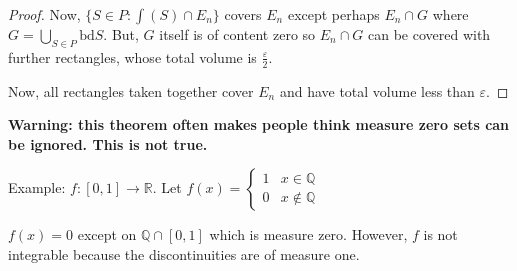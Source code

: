 \documentclass[a4paper]{article}
\numberwithin{equation}{section}
\newcommand{\R}{\mathbb{R}}
\begin{document}
\begin{theorem}
\begin{proof}
        Now, $\{S\in P:\int(S)\cap E_n\}$ covers $E_n$ except perhaps $E_n\cap G$ where $G=\bigcup_{S\in P}\mathrm{bd}S$. But, $G$ itself is of content zero so $E_n\cap G$ can be covered with further rectangles, whose total volume is $\frac{\varepsilon}{2}$.

        Now, all rectangles taken together cover $E_n$ and have total volume less than $\varepsilon$.
    \end{proof}

    \textbf{Warning: this theorem often makes people think measure zero sets can be ignored. This is not true.}
    
    Example: $f:[0,1]\to\R$. Let $f(x)=\begin{cases}
        1 & x\in\mathbb Q\\
        0 & x\notin\mathbb Q
    \end{cases}$

    $f(x)=0$ except on $\mathbb Q\cap[0,1]$ which is measure zero. However, $f$ is not integrable because the discontinuities are of measure one.
\end{theorem}
\end{document}

